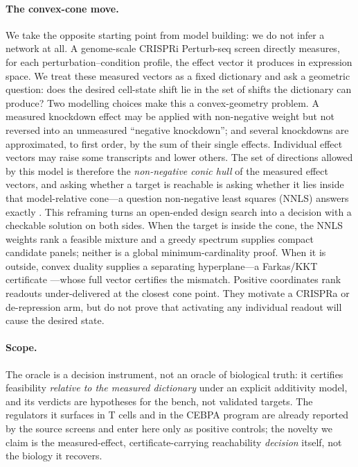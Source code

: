 \paragraph{The convex-cone move.}
We take the opposite starting point from model building: we do not infer a network at all.
A genome-scale CRISPRi Perturb-seq screen \citep{Zhu2025} directly measures, for each
perturbation--condition profile, the effect vector it produces in expression
space. We treat these measured vectors as a fixed dictionary and ask a geometric question:
does the desired cell-state shift lie in the set of shifts the dictionary can produce?
Two modelling choices make this a convex-geometry problem. A measured knockdown effect may be
applied with non-negative weight but not reversed into an unmeasured ``negative knockdown'';
and several knockdowns are approximated, to first order, by the sum of their single effects.
Individual effect vectors may raise some transcripts and lower others. The set of directions
allowed by this model is therefore the \emph{non-negative conic hull} of
the measured effect vectors, and asking whether a target is reachable is asking whether it
lies inside that model-relative cone---a question non-negative least squares (NNLS) answers exactly
\citep{LawsonHanson1974}. This reframing turns an open-ended design search into a decision
with a checkable solution on both sides. When the target is inside the cone, the NNLS weights
rank a feasible mixture and a greedy spectrum supplies compact candidate panels; neither is a
global minimum-cardinality proof. When it is outside, convex duality supplies a separating
hyperplane---a Farkas/KKT certificate \citep{Farkas1902,KuhnTucker1951}---whose full vector
certifies the mismatch. Positive coordinates rank readouts under-delivered at the closest cone
point. They motivate a CRISPRa or de-repression arm, but do not prove that activating any
individual readout will cause the desired state.

\paragraph{Scope.}
The oracle is a decision instrument, not an oracle of biological truth: it certifies
feasibility \emph{relative to the measured dictionary} under an explicit additivity model, and
its verdicts are hypotheses for the bench, not validated targets. The regulators it surfaces in
T cells and in the CEBPA program are already reported by the source screens
\citep{Zhu2025,Norman2019} and enter here only as positive controls; the novelty we claim is
the measured-effect, certificate-carrying reachability \emph{decision} itself, not the biology
it recovers.

